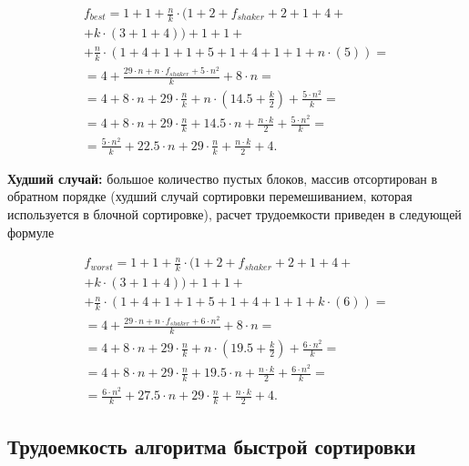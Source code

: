 \begin{equation}
	\label{сomplexity:block_best}
	\begin{gathered}
		f_{best} = 1 +1 + \frac{n}{k} \cdot(1 + 2+f_{shaker} + 2 + 1 + 4 + \\
		+ k \cdot (3 + 1 + 4)) + 1 + 1 + \\
		+ \frac{n}{k} \cdot (1 + 4 + 1 + 1 + 5 + 1 + 4 + 1 + 1 + n \cdot (5)) = \\
		= 4 + \frac{29\cdot n + n \cdot f_{shaker} + 5 \cdot n^2}{k}  + 8 \cdot n  = \\
		= 4 + 8 \cdot n + 29 \cdot \frac{n}{k} + n \cdot (14.5 + \frac{k}{2}) + \frac{5 \cdot n^2}{k} = \\
		= 4 + 8 \cdot n + 29 \cdot \frac{n}{k} + 14.5 \cdot n + \frac{n \cdot k}{2} + \frac{5 \cdot n^2}{k} = \\
		= \frac{5 \cdot n^2}{k} + 22.5 \cdot n + 29 \cdot \frac{n}{k} + \frac{n \cdot k}{2} + 4.
	\end{gathered}
\end{equation}

\textbf{Худший случай:} большое количество пустых блоков, массив отсортирован в обратном порядке (худший случай сортировки перемешиванием, которая используется в блочной сортировке), расчет трудоемкости приведен в следующей формуле

\begin{equation}
	\label{сomplexity:block_worst}
	\begin{gathered}
		f_{worst} = 1 +1 + \frac{n}{k} \cdot(1 + 2+f_{shaker} + 2 + 1 + 4 + \\
		+ k \cdot (3 + 1 + 4)) + 1 + 1 + \\
		 + \frac{n}{k} \cdot (1 + 4 + 1 + 1 + 5 + 1 + 4 + 1 + 1 + k \cdot (6)) = \\
		= 4 + \frac{29\cdot n + n \cdot f_{shaker} + 6 \cdot n^2}{k}  + 8 \cdot n  = \\
		= 4 + 8 \cdot n + 29 \cdot \frac{n}{k} + n \cdot (19.5 + \frac{k}{2}) + \frac{6 \cdot n^2}{k} = \\
		= 4 + 8 \cdot n + 29 \cdot \frac{n}{k} + 19.5 \cdot n + \frac{n \cdot k}{2} + \frac{6 \cdot n^2}{k} = \\
		= \frac{6 \cdot n^2}{k} + 27.5 \cdot n + 29 \cdot \frac{n}{k} + \frac{n \cdot k}{2} + 4.
	\end{gathered}
\end{equation}


\subsection{Трудоемкость алгоритма быстрой сортировки}

